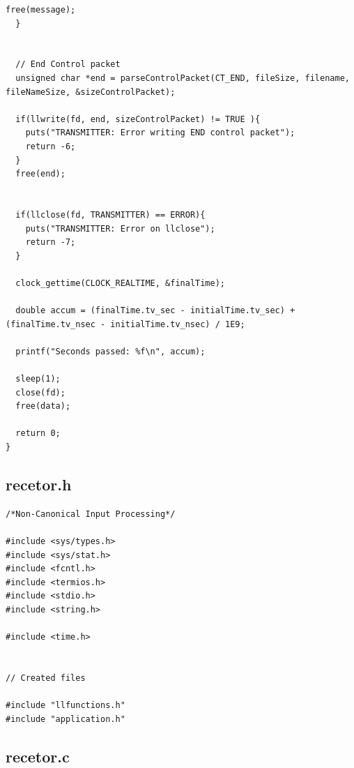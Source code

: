 \documentclass{article}
\begin{document}
\begin{lstlisting}[style=CStyle]
    free(message);
  }


  // End Control packet
  unsigned char *end = parseControlPacket(CT_END, fileSize, filename, fileNameSize, &sizeControlPacket);

  if(llwrite(fd, end, sizeControlPacket) != TRUE ){
    puts("TRANSMITTER: Error writing END control packet");
    return -6;
  }
  free(end);


  if(llclose(fd, TRANSMITTER) == ERROR){
    puts("TRANSMITTER: Error on llclose");
    return -7;
  }

  clock_gettime(CLOCK_REALTIME, &finalTime);

  double accum = (finalTime.tv_sec - initialTime.tv_sec) + (finalTime.tv_nsec - initialTime.tv_nsec) / 1E9;

  printf("Seconds passed: %f\n", accum);

  sleep(1);
  close(fd);
  free(data);

  return 0;
}
\end{lstlisting}


\subsection{recetor.h}

\begin{lstlisting}[style=CStyle]
/*Non-Canonical Input Processing*/

#include <sys/types.h>
#include <sys/stat.h>
#include <fcntl.h>
#include <termios.h>
#include <stdio.h>
#include <string.h>

#include <time.h>


// Created files

#include "llfunctions.h"
#include "application.h"
\end{lstlisting}

\subsection{recetor.c}
\end{document}
